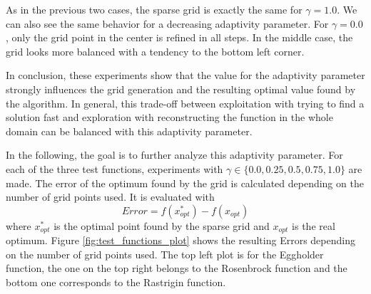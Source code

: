 As in the previous two cases, the sparse grid is exactly the same for $ \gamma = 1.0 $. We can also see the same behavior for a decreasing adaptivity parameter. For $ \gamma = 0.0 $, only the grid point in the center is refined in all steps. In the middle case, the grid looks more balanced with a tendency to the bottom left corner.  \newline 


In conclusion, these experiments show that the value for the adaptivity parameter strongly influences the grid generation and the resulting optimal value found by the algorithm. In general, this trade-off between exploitation with trying to find a solution fast and exploration with reconstructing the function in the whole domain can be balanced with this adaptivity parameter. \newline

In the following, the goal is to further analyze this adaptivity parameter. For each of the three test functions, experiments with $ \gamma \in \{0.0, 0.25, 0.5, 0.75, 1.0\} $ are made. The error of the optimum found by the grid is calculated depending on the number of grid points used. It is evaluated with 
\begin{equation}
 Error = f(x_{opt}^*) - f(x_{opt}) 
\end{equation}
where $ x_{opt}^* $ is the optimal point found by the sparse grid and $ x_{opt} $ is the real optimum. Figure \ref{fig:test_functions_plot} shows the resulting Errors depending on the number of grid points used. The top left plot is for the Eggholder function, the one on the top right belongs to the Rosenbrock function and the bottom one corresponds to the Rastrigin function. \newline

